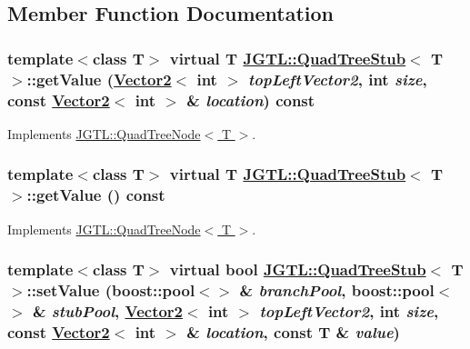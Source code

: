 \subsection{Member Function Documentation}
\hypertarget{class_j_g_t_l_1_1_quad_tree_stub_99e89a45f21e503a1cef13f54a8ef65b}{
\subsubsection[getValue]{\setlength{\rightskip}{0pt plus 5cm}template$<$class T$>$ virtual T \hyperlink{class_j_g_t_l_1_1_quad_tree_stub}{JGTL::Quad\-Tree\-Stub}$<$ T $>$::get\-Value (\hyperlink{class_j_g_t_l_1_1_vector2}{Vector2}$<$ int $>$ {\em top\-Left\-Vector2}, int {\em size}, const \hyperlink{class_j_g_t_l_1_1_vector2}{Vector2}$<$ int $>$ \& {\em location}) const}}
\label{class_j_g_t_l_1_1_quad_tree_stub_99e89a45f21e503a1cef13f54a8ef65b}




Implements \hyperlink{class_j_g_t_l_1_1_quad_tree_node_bc249b527b146888c21dac71783f42b6}{JGTL::Quad\-Tree\-Node$<$ T $>$}.\hypertarget{class_j_g_t_l_1_1_quad_tree_stub_48f2d4a15b1b8b850b9d446fe972f561}{
\subsubsection[getValue]{\setlength{\rightskip}{0pt plus 5cm}template$<$class T$>$ virtual T \hyperlink{class_j_g_t_l_1_1_quad_tree_stub}{JGTL::Quad\-Tree\-Stub}$<$ T $>$::get\-Value () const}}
\label{class_j_g_t_l_1_1_quad_tree_stub_48f2d4a15b1b8b850b9d446fe972f561}




Implements \hyperlink{class_j_g_t_l_1_1_quad_tree_node_b92e9755284317f2d8102f028b0481c7}{JGTL::Quad\-Tree\-Node$<$ T $>$}.\hypertarget{class_j_g_t_l_1_1_quad_tree_stub_a89e27cf98e753df813770d7007b7a9b}{
\subsubsection[setValue]{\setlength{\rightskip}{0pt plus 5cm}template$<$class T$>$ virtual bool \hyperlink{class_j_g_t_l_1_1_quad_tree_stub}{JGTL::Quad\-Tree\-Stub}$<$ T $>$::set\-Value (boost::pool$<$$>$ \& {\em branch\-Pool}, boost::pool$<$$>$ \& {\em stub\-Pool}, \hyperlink{class_j_g_t_l_1_1_vector2}{Vector2}$<$ int $>$ {\em top\-Left\-Vector2}, int {\em size}, const \hyperlink{class_j_g_t_l_1_1_vector2}{Vector2}$<$ int $>$ \& {\em location}, const T \& {\em value})}}
\label{class_j_g_t_l_1_1_quad_tree_stub_a89e27cf98e753df813770d7007b7a9b}




